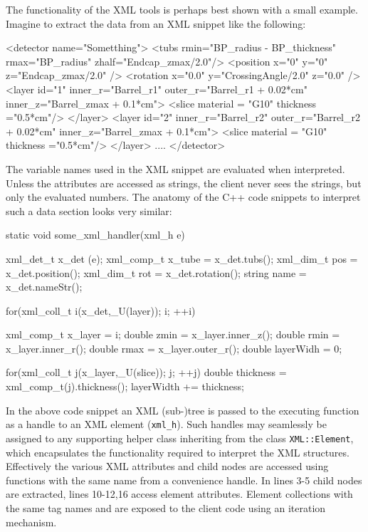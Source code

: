 \documentclass[10pt,a4paper]{article}
\begin{document}
\noindent 
The functionality of the XML tools is perhaps best shown with a small example.
Imagine to extract the data from an XML snippet like the following:
\begin{code}
  <detector name="Sometthing">
    <tubs rmin="BP_radius - BP_thickness" rmax="BP_radius" zhalf="Endcap_zmax/2.0"/>
    <position x="0" y="0" z="Endcap_zmax/2.0" />
    <rotation x="0.0" y="CrossingAngle/2.0" z="0.0" />
    <layer id="1" inner_r="Barrel_r1" 
    	   outer_r="Barrel_r1 + 0.02*cm" inner_z="Barrel_zmax + 0.1*cm">
      <slice material = "G10" thickness ="0.5*cm"/>
    </layer>
    <layer id="2" inner_r="Barrel_r2" 
	   outer_r="Barrel_r2 + 0.02*cm" inner_z="Barrel_zmax + 0.1*cm">
     <slice material = "G10" thickness ="0.5*cm"/>
    </layer>
    ....
  </detector>
\end{code}

The variable names used in the XML snippet are evaluated when interpreted.
Unless the attributes are accessed as strings, the client never sees the 
strings, but only the evaluated numbers.
The anatomy of the C++ code snippets to interpret such a data section 
looks very similar:
\begin{code}
  static void some_xml_handler(xml_h e)  {
    xml_det_t  x_det  (e);
    xml_comp_t x_tube    = x_det.tubs();
    xml_dim_t  pos       = x_det.position();
    xml_dim_t  rot       = x_det.rotation();
    string     name      = x_det.nameStr();
      
    for(xml_coll_t i(x_det,_U(layer)); i; ++i)  {
      xml_comp_t x_layer = i;
      double  zmin = x_layer.inner_z();
      double  rmin = x_layer.inner_r();
      double  rmax = x_layer.outer_r();
      double  layerWidh = 0;
        
      for(xml_coll_t j(x_layer,_U(slice)); j; ++j)  {
        double thickness = xml_comp_t(j).thickness();
        layerWidth += thickness;
      }
    }
  }
\end{code}
In the above code snippet an XML (sub-)tree is passed to the executing 
function as a handle to an XML element ({\tt{xml\_h}}). Such handles may seamlessly be
assigned to any supporting helper class inheriting from the
class {\tt{XML::Element}}, which encapsulates the functionality required to 
interpret the XML structures.
Effectively the various XML attributes and child nodes 
are accessed using functions with the same
name from a convenience handle. 
In lines 3-5 child nodes are extracted, lines 10-12,16 access element attributes.
Element collections with the same tag names  and  are exposed
to the client code using an iteration mechanism.
\end{document}

